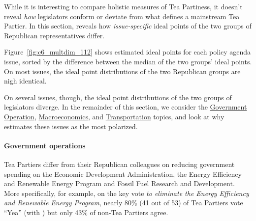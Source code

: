 While it is interesting to compare holistic measures of Tea Partiness,
it doesn't reveal \emph{how} legislators conform or deviate from what
defines a mainstream Tea Partier.  In this section, \name{} reveals
how \emph{issue-specific} ideal points of the two groups of Republican
representatives differ.

Figure~\ref{fig:c6_multdim_112} shows estimated ideal points
for each policy agenda issue, sorted by the difference between the median of the
two groups' ideal points. On most issues, the ideal point distributions of the
two Republican groups are nigh identical.

On several issues, though, the ideal point distributions of the two groups of
legislators diverge.
In the remainder of this section, we consider the
\underline{Government Operation}, \underline{Macroeconomics}, and
\underline{Transportation} topics, and look at why \name{} estimates these issues as
the most polarized.

\paragraph{Government operations}

Tea Partiers differ from their Republican colleagues on reducing
government spending on the Economic Development Administration, the
Energy Efficiency and Renewable Energy Program and Fossil Fuel
Research and Development. More specifically, for example, on the key
vote \textit{to eliminate the Energy Efficiency and Renewable Energy
  Program}, nearly 80\% (41 out of 53) of Tea Partiers vote ``Yea''
(with \fw{}) but only 43\% of non-Tea Partiers agree.

